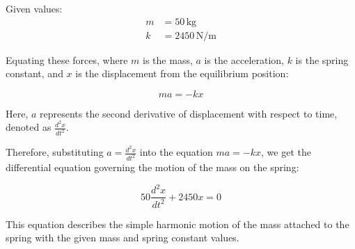 \documentclass[journal,12pt,twocolumn]{IEEEtran}
\theoremstyle{remark}
\begin{document}
Given values:
\begin{align*}
    m &= 50 \, \text{kg} \\
    k &= 2450 \, \text{N/m}
\end{align*}

Equating these forces, where $m$ is the mass, $a$ is the acceleration, $k$ is the spring constant, and $x$ is the displacement from the equilibrium position:

\begin{equation}
    ma = -kx
\end{equation}

Here, $a$ represents the second derivative of displacement with respect to time, denoted as $\frac{d^2x}{dt^2}$.

Therefore, substituting $a = \frac{d^2x}{dt^2}$ into the equation $ma = -kx$, we get the differential equation governing the motion of the mass on the spring:

\begin{equation}
    50 \frac{d^2x}{dt^2} + 2450x = 0
\end{equation}

This equation describes the simple harmonic motion of the mass attached to the spring with the given mass and spring constant values.	
\end{document}
